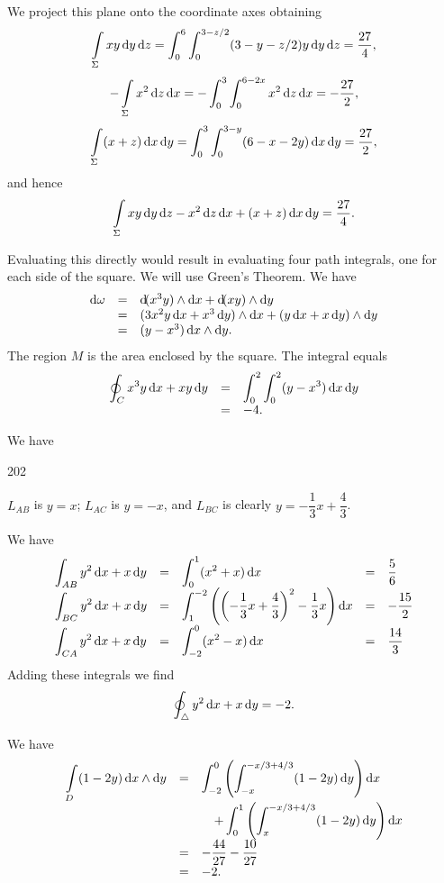 \begin{Answer}{13.9}
 We project this plane
onto the coordinate axes obtaining
$$ \dint \limits_\Sigma xy\d{y}\d{z} = \dint _0 ^6 \dint _0 ^{3-z/2} (3-y-z/2)y \d{y}  \d{z} =  \frac{27}{4},  $$
$$ -\dint \limits_\Sigma x^2\d{z}\d{x} = -\dint _0 ^3 \dint _0 ^{6-2x} x^2 \d{z}  \d{x} =  -\frac{27}{2},  $$
$$ \dint \limits_\Sigma (x + z)\d{x}\d{y} = \dint _0 ^3 \dint _0 ^{3 - y} (6 - x - 2y) \d{x}  \d{y} =  \frac{27}{2},  $$
and hence
$$\dint \limits_\Sigma xy\d{y}\d{z} -
x^2\d{z} \d{x} + (x + z)\d{x} \d{y} = \frac{27}{4}.
$$
\end{Answer}
\begin{Answer}{13.10}
Evaluating this directly would result in evaluating four path
integrals, one for each side of the square. We will use Green's
Theorem. We have
$$\begin{array}{lll}\d{\omega} &  = &  \d (x^3y) \wedge \d{x}+ \d (xy) \wedge \d{y}\\
& = & (3x^2y\d{x}+ x^3\d{y}) \wedge \d{x}+ (y\d{x}+
x\d{y} ) \wedge \d{y} \\
& = & (y - x^3)\d{x}\wedge \d{y}.
\end{array}$$
The region $M$ is the area enclosed by the square. The integral
equals
$$\begin{array}{lll}
\doint _C x^3y\d{x}+ xy\d{y} & = & \dint _0 ^2 \dint _0 ^2 (y
- x^3)\d{x} \d{y} \\
& = & -4.
\end{array}$$
\end{Answer}
\begin{Answer}{13.11}
We have
\begin{dingautolist}{202} \item $L_{AB}$ is $y = x$;  $L_{AC}$  is
$y = -x$, and  $L_{BC}$ is clearly $y = -\dfrac{1}{3}x +
\dfrac{4}{3}$.
 \item  We have \renewcommand{\arraystretch}{1.5}
$${\everymath{\dis}\begin{array}{lllll}  \dint _{AB} y^2\d{x}+ x\d{y}  & = &  \dint _0 ^1 (x^2 + x)\d{x}            & = &  \dfrac{5}{6}  \\
\dint _{BC} y^2\d{x}+ x\d{y}  & = &  \dint _1 ^{-2}
\left(\left(-\dfrac{1}{3}x + \dfrac{4}{3}\right)^2 -\dfrac{1}{3}x \right)\d{x}            & = &  -\dfrac{15}{2}  \\
\dint _{CA} y^2\d{x}+ x\d{y}  & = &  \dint _{-2} ^0 (x^2 - x)\d{x}            & = &  \dfrac{14}{3}  \\
\end{array} }$$Adding these integrals we find $$ \doint _\triangle y^2\d{x}+ x\d{y} = -2.$$

 \item   We have
$${\everymath{\dis}\begin{array}{lll}\dint\limits_{D} (1 - 2y) \d{x}\wedge\d{y} & = & \dint _{-2} ^0 \left(\dint _{-x} ^{-x/3 + 4/3} (1 - 2y)
\d{y}\right) \d{x}\\ & &\quad + \dint _{0} ^1 \left(\dint _{x} ^{-x/3
+ 4/3}
(1 - 2y)\d{y}\right) \d{x} \\
& = & -\dfrac{44}{27} - \dfrac{10}{27} \\
& = & -2.
\end{array}}$$
\end{dingautolist}
\end{Answer}
